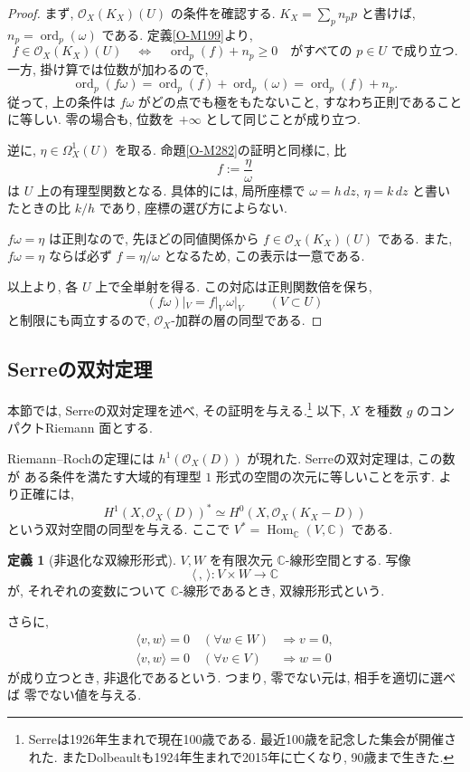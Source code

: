 \documentclass[dvipdfmx,a4paper,11pt]{article} %
\newcommand{\C}{\mathbb{C}}
\theoremstyle{definition}
\numberwithin{equation}{section}
\newtheorem{dfn}[thm]{定義}
\begin{document}
\begin{proof}
まず, $\mathcal O_X(K_X)(U)$ の条件を確認する.
$K_X=\sum_p n_p p$ と書けば,
$n_p=\operatorname{ord}_p(\omega)$ である.
定義\ref{O-M199}より,
\[
f\in\mathcal O_X(K_X)(U)
\quad\Longleftrightarrow\quad
\operatorname{ord}_p(f)+n_p\geq0
\quad\text{がすべての }p\in U\text{ で成り立つ}.
\]
一方, 掛け算では位数が加わるので,
\[
\operatorname{ord}_p(f\omega)
=\operatorname{ord}_p(f)+\operatorname{ord}_p(\omega)
=\operatorname{ord}_p(f)+n_p.
\]
従って, 上の条件は $f\omega$ がどの点でも極をもたないこと,
すなわち正則であることに等しい.
零の場合も, 位数を $+\infty$ として同じことが成り立つ.

逆に, $\eta\in\Omega_X^1(U)$ を取る.
命題\ref{O-M282}の証明と同様に, 比
\[
f:=\frac{\eta}{\omega}
\]
は $U$ 上の有理型関数となる.
具体的には, 局所座標で $\omega=h\,dz$, $\eta=k\,dz$
と書いたときの比 $k/h$ であり, 座標の選び方によらない.

$f\omega=\eta$ は正則なので,
先ほどの同値関係から $f\in\mathcal O_X(K_X)(U)$ である.
また, $f\omega=\eta$ ならば必ず $f=\eta/\omega$ となるため,
この表示は一意である.

以上より, 各 $U$ 上で全単射を得る.
この対応は正則関数倍を保ち,
\[
(f\omega)|_V=f|_V\,\omega|_V
\qquad(V\subset U)
\]
と制限にも両立するので,
$\mathcal O_X$-加群の層の同型である.
\end{proof}

\subsection{Serreの双対定理}\label{O-S050}
本節では, Serreの双対定理を述べ, その証明を与える.\footnote{Serreは1926年生まれで現在100歳である. 最近100歳を記念した集会が開催された. またDolbeaultも1924年生まれで2015年に亡くなり, 90歳まで生きた.}
以下, $X$ を種数 $g$ のコンパクトRiemann 面とする.

Riemann--Rochの定理には
$h^1(\mathcal O_X(D))$ が現れた.
Serreの双対定理は, この数が
ある条件を満たす大域的有理型 $1$ 形式の空間の次元に等しいことを示す.
より正確には, 
\[
H^1(X,\mathcal O_X(D))^*
\simeq H^0(X,\mathcal O_X(K_X-D))
\]
という双対空間の同型を与える.
ここで $V^*=\operatorname{Hom}_{\C}(V,\C)$ である.


\begin{dfn}[非退化な双線形形式]\label{O-M287}
$V,W$ を有限次元 $\C$-線形空間とする.
写像
\[
\langle\, ,\,\rangle:V\times W\longrightarrow\C
\]
が, それぞれの変数について $\C$-線形であるとき, 
双線形形式という.

さらに, 
\[
\begin{aligned}
\langle v,w\rangle=0\quad(\forall w\in W)
&\Longrightarrow v=0,\\
\langle v,w\rangle=0\quad(\forall v\in V)
&\Longrightarrow w=0
\end{aligned}
\]
が成り立つとき, 非退化であるという.
つまり, 零でない元は, 相手を適切に選べば
零でない値を与える.
\end{dfn}
\end{document}
